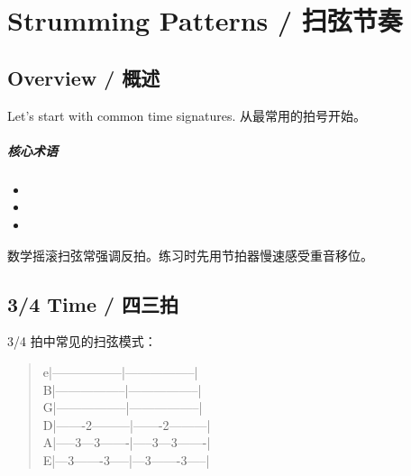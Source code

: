 \chapter{Strumming Patterns / 扫弦节奏}
\label{ch:strumming}

\section{Overview / 概述}



\enandcn
  {Let's start with common time signatures.}
  {从最常用的拍号开始。}

\paragraph{核心术语}
\begin{itemize}[leftmargin=*]
  \item {}
  \item {}
  \item {}
\end{itemize}

\begin{notebox}[提示]
  数学摇滚扫弦常强调反拍。练习时先用节拍器慢速感受重音移位。
\end{notebox}

\section{3/4 Time / 四三拍}

\begin{examplebox}[3/4 扫弦模式]
  3/4 拍中常见的扫弦模式：
\end{examplebox}

\begin{verse}
  \small\ttfamily
  e|-----------------|-----------------|\\
  B|-----------------|-----------------|\\
  G|-----------------|-----------------|\\
  D|-------2---------|-------2---------|\\
  A|-----3---3-------|-----3---3-------|\\
  E|---3-------3-----|---3-------3-----|\\
\end{verse}


